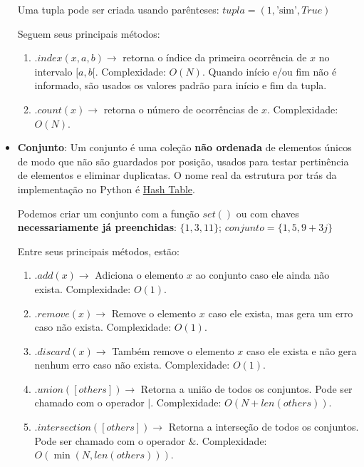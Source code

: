 \documentclass[11pt, a4paper]{article}
\begin{document}
\begin{itemize}
    Uma tupla pode ser criada usando parênteses: \(tupla = (1,\text{'sim'},True)\)

    Seguem seus principais métodos:
    \begin{enumerate}
        \item \(.index(x,a,b) \rightarrow\) retorna o índice da primeira ocorrência de \(x\) no intervalo \([a,b[\). Complexidade: \(O(N)\). Quando início e/ou fim não é informado, são usados os valores padrão para início e fim da tupla.

        \item \(.count(x) \rightarrow\) retorna o número de ocorrências de \(x\). Complexidade: \(O(N)\).
    \end{enumerate}

    \item \textbf{Conjunto}: Um conjunto é uma coleção \textbf{não ordenada} de elementos únicos de modo que não são guardados por posição, usados para testar pertinência de elementos e eliminar duplicatas. O nome real da estrutura por trás da implementação no Python é \href{https://en.wikipedia.org/wiki/Hash_table}{Hash Table}. 
    
    Podemos criar um conjunto com a função \(set()\) ou com chaves \textbf{necessariamente já preenchidas}: \(\{1,3,11 \}\); \(conjunto = \{1,5,9+3j\}\)

    Entre seus principais métodos, estão:

    \begin{enumerate}
        \item \(.add(x) \rightarrow\) Adiciona o elemento \(x\) ao conjunto caso ele ainda não exista. Complexidade: \(O(1)\).

        \item \(.remove(x) \rightarrow\) Remove o elemento \(x\) caso ele exista, mas gera um erro caso não exista. Complexidade: \(O(1)\).

        \item \(.discard(x) \rightarrow\) Também remove o elemento \(x\) caso ele exista e não gera nenhum erro caso não exista. Complexidade: \(O(1)\).

        \item \(.union([others]) \rightarrow\) Retorna a união de todos os conjuntos. Pode ser chamado com o operador \(|\). Complexidade: \(O(N+len(others))\).

        \item \(.intersection([others]) \rightarrow\) Retorna a interseção de todos os conjuntos. Pode ser chamado com o operador \(\&\). Complexidade: \(O(\min(N,len(others)))\).


\end{enumerate}
\end{itemize}
\end{document}
